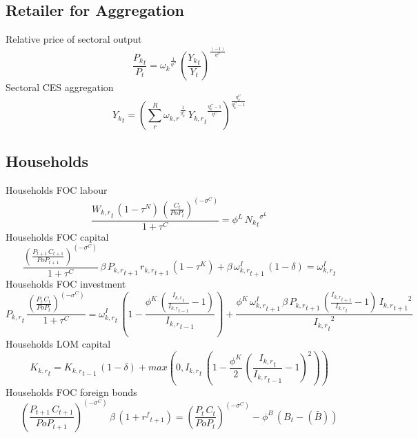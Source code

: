 \subsection{Retailer for Aggregation}
Relative price of sectoral output
\begin{dmath}
\frac{{{P_k}_{t}}}{{P_{t}}}={{\omega_{k}}}^{\frac{1}{{{\eta^{C}}}}}\, \left(\frac{{{Y_k}_{t}}}{{Y_{t}}}\right)^{\frac{\left(-1\right)}{{{\eta^{C}}}}}
\end{dmath}
Sectoral CES aggregation
\begin{dmath}
{{Y_k}_{t}}=\left(\sum_{r}^{R}{{\omega_{k,r}}}^{\frac{1}{{{\eta^{C}_{k}}}}}\, {{Y_{k,r}}_{t}}^{\frac{{{\eta^{C}_{k}}}-1}{{{\eta^{C}}}}}\right)^{\frac{{{\eta^{C}_{k}}}}{{{\eta^{C}_{k}}}-1}}
\end{dmath}

\subsection{Households}
Households FOC labour
\begin{dmath}
\frac{{{W_{k,r}}_{t}}\, \left(1-{{\tau^{N}}}\right)\, \left(\frac{{C_{t}}}{{PoP_{t}}}\right)^{\left(-{{\sigma^{C}}}\right)}}{1+{{\tau^{C}}}}={{\phi^{L}}}\, {{N_k}_{t}}^{{{\sigma^{L}}}}
\end{dmath}
Households FOC capital
\begin{dmath}
\frac{\left(\frac{{P_{t+1}}\, {C_{t+1}}}{{PoP_{t+1}}}\right)^{\left(-{{\sigma^{C}}}\right)}}{1+{{\tau^{C}}}}\, {{\beta}}\, {{P_{k,r}}_{t+1}}\, {{r_{k,r}}_{t+1}}\, \left(1-{{\tau^{K}}}\right)+{{\beta}}\, {{\omega^I_{k,r}}_{t+1}}\, \left(1-{{\delta}}\right)={{\omega^I_{k,r}}_{t}}
\end{dmath}
Households FOC investment
\begin{dmath}
{{P_{k,r}}_{t}}\, \frac{\left(\frac{{P_{t}}\, {C_{t}}}{{PoP_{t}}}\right)^{\left(-{{\sigma^{C}}}\right)}}{1+{{\tau^{C}}}}={{\omega^I_{k,r}}_{t}}\, \left(1-\frac{{{\phi^{K}}}\, \left(\frac{{{I_{k,r}}_{t}}}{{{I_{k,r}}_{t-1}}}-1\right)}{{{I_{k,r}}_{t-1}}}\right)+\frac{{{\phi^{K}}}\, {{\omega^I_{k,r}}_{t+1}}\, {{\beta}}\, {{P_{k,r}}_{t+1}}\, \left(\frac{{{I_{k,r}}_{t+1}}}{{{I_{k,r}}_{t}}}-1\right)\, {{I_{k,r}}_{t+1}}^{2}}{{{I_{k,r}}_{t}}^{2}}
\end{dmath}
Households LOM capital
\begin{dmath}
{{K_{k,r}}_{t}}={{K_{k,r}}_{t-1}}\, \left(1-{{\delta}}\right)+max(0,{{I_{k,r}}_{t}}\, \left(1-\frac{{{\phi^{K}}}}{2}\, \left(\frac{{{I_{k,r}}_{t}}}{{{I_{k,r}}_{t-1}}}-1\right)^{2}\right))
\end{dmath}
Households FOC foreign bonds
\begin{dmath}
\left(\frac{{P_{t+1}}\, {C_{t+1}}}{{PoP_{t+1}}}\right)^{\left(-{{\sigma^{C}}}\right)}\, {{\beta}}\, \left(1+{{r^{f}}_{t+1}}\right)=\left(\frac{{P_{t}}\, {C_{t}}}{{PoP_{t}}}\right)^{\left(-{{\sigma^{C}}}\right)}-{{\phi^{B}}}\, \left({B_{t}}-(\bar{B})\right)
\end{dmath}

